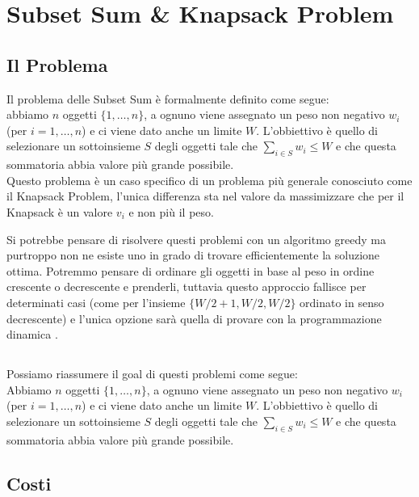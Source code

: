 \chapter{Subset Sum \& Knapsack Problem }

\section{Il Problema}

Il problema delle Subset Sum è formalmente definito come segue:\\

\- abbiamo $n$ oggetti $\{1, \ldots, n\}$, a ognuno viene assegnato un
peso non negativo $w_i$ (per $i = 1, \ldots, n$) e ci viene dato anche un
limite $W$. L'obbiettivo è quello di selezionare un sottoinsieme $S$ degli
oggetti tale che $\sum_{i \in S}w_i \leq W$ e che questa sommatoria abbia valore
più grande possibile.\\

Questo problema è un caso specifico di un problema più generale conosciuto come
il Knapsack Problem, l'unica differenza sta nel valore da massimizzare che per il
Knapsack è un valore $v_i$ e non più il peso.

Si potrebbe pensare di risolvere questi problemi con un algoritmo greedy ma
purtroppo non ne esiste uno in grado di trovare efficientemente la soluzione ottima.
Potremmo pensare di ordinare gli oggetti in base al peso in ordine crescente o
decrescente e prenderli, tuttavia questo approccio fallisce per determinati casi
(come per l'insieme $\{W/2+1, W/2, W/2\}$ ordinato in senso decrescente) e l'unica
opzione sarà quella di provare con la programmazione dinamica .
\newpage

\section{\goal}

Possiamo riassumere il goal di questi problemi come segue:\\

\- Abbiamo $n$ oggetti $\{1, \ldots, n\}$, a ognuno viene assegnato un
peso non negativo $w_i$ (per $i = 1, \ldots, n$) e ci viene dato anche un
limite $W$. L'obbiettivo è quello di selezionare un sottoinsieme $S$ degli oggetti
tale che $\sum_{i \in S}w_i \leq W$ e che questa sommatoria abbia valore più
grande possibile.

\section{Costi}

